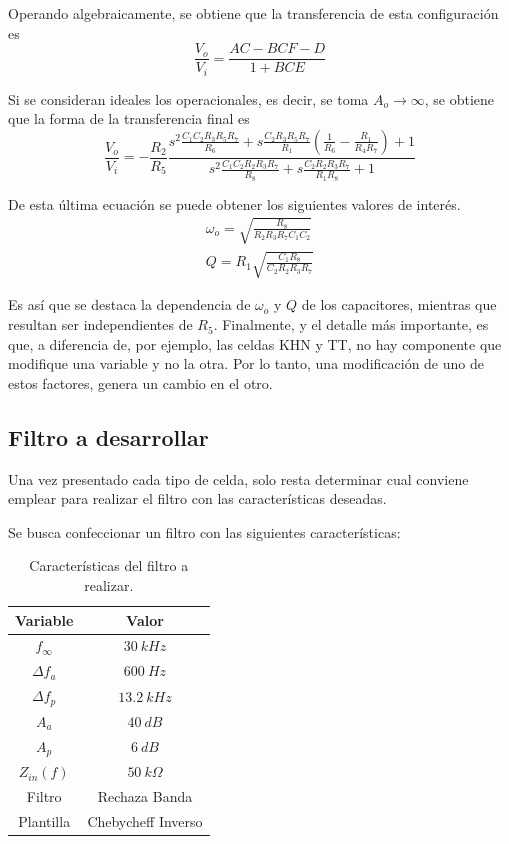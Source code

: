 Operando algebraicamente, se obtiene que la transferencia de esta configuración es
\begin{equation}
	\frac{V_o}{V_i} = \frac{AC - BCF - D}{1 + BCE}
	\label{equ:transf-ft-r}
\end{equation}

Si se consideran ideales los operacionales, es decir, se toma $A_o \rightarrow \infty$, se obtiene que la forma de la transferencia final es
\begin{equation}
	\frac{V_o}{V_i} = - \frac{R_2}{R_5} \frac{s^{2} \frac{C_1 C_2 R_3 R_5 R_7}{R_6} + s \frac{C_2 R_3 R_5 R_7}{R_1} \left( \frac{1}{R_6} - \frac{R_1}{R_4 R_7} \right) + 1}{s^{2} \frac{C_1 C_2 R_2 R_3 R_7}{R_8} + s \frac{C_2 R_2 R_3 R_7}{R_1 R_8} + 1}
\label{equ:transf-ft-i}
\end{equation}

De esta última ecuación se puede obtener los siguientes valores de interés.
\begin{equation}
\begin{split}
	\omega_o = \sqrt{\frac{R_8}{R_2 R_3 R_7 C_1 C_2}} \\
	Q = R_1 \sqrt{\frac{C_1 R_8}{C_2 R_2 R_3 R_7}} 
\end{split}
\label{equ:woq-ft}
\end{equation}

Es así que se destaca la dependencia de $\omega_o$ y $Q$ de los capacitores, mientras que resultan ser independientes de $R_5$. Finalmente, y el detalle más importante, es que, a diferencia de, por ejemplo, las celdas KHN y TT, no hay componente que modifique una variable y no la otra. Por lo tanto, una modificación de uno de estos factores, genera un cambio en el otro.

\subsection{Filtro a desarrollar}
Una vez presentado cada tipo de celda, solo resta determinar cual conviene emplear para realizar el filtro con las características deseadas.

Se busca confeccionar un filtro con las siguientes características:
\begin{table}[H]
\centering
\begin{tabular}{cc}
\hline
\textbf{Variable} & \textbf{Valor} \\
\hline
$f_\infty$ & $30 \ kHz$ \\
$\Delta f_a$ & $600 \ Hz$ \\
$\Delta f_p$ & $13.2 \ kHz$ \\
$A_a$ & $40 \ dB$ \\
$A_p$ & $6 \ dB$ \\
$Z_{in}(f)$ & $50 \ k\Omega$ \\
Filtro & Rechaza Banda \\
Plantilla & Chebycheff Inverso \\
\hline
\end{tabular}
\caption{Características del filtro a realizar.}
\label{tabla:caracteristicas1}
\end{table}

